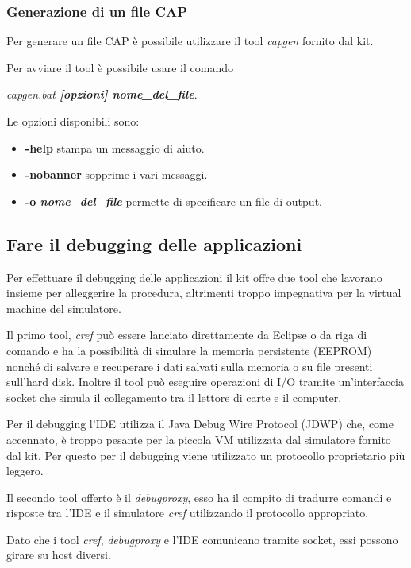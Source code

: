 \subsubsection{Generazione di un file CAP}
Per generare un file CAP è possibile utilizzare il tool \textit{capgen} fornito dal kit.

Per avviare il tool è possibile usare il comando
\begin{center}
    \textit{capgen.bat \textbf{[opzioni] nome\_del\_file}}.
\end{center}

Le opzioni disponibili sono:
\begin{itemize}
    \item \textbf{-help} stampa un messaggio di aiuto.
    \item \textbf{-nobanner} sopprime i vari messaggi.
    \item \textbf{-o \textit{nome\_del\_file}} permette di specificare un file di output.
\end{itemize}
 
\subsection{Fare il debugging delle applicazioni}
Per effettuare il debugging delle applicazioni il kit offre due tool che lavorano insieme per alleggerire la procedura, altrimenti troppo impegnativa per la virtual machine del simulatore.

Il primo tool, \textit{cref} può essere lanciato direttamente da Eclipse o da riga di comando e ha la possibilità di simulare la memoria persistente (EEPROM) nonché di salvare e recuperare i dati salvati sulla memoria o su file presenti sull'hard disk. Inoltre il tool può eseguire operazioni di I/O tramite un'interfaccia socket che simula il collegamento tra il lettore di carte e il computer.

Per il debugging l'IDE utilizza il Java Debug Wire Protocol (JDWP) che, come accennato, è troppo pesante per la piccola VM utilizzata dal simulatore fornito dal kit. Per questo per il debugging viene utilizzato un protocollo proprietario più leggero.

Il secondo tool offerto è il \textit{debugproxy}, esso ha il compito di tradurre comandi e risposte tra l'IDE e il simulatore \textit{cref} utilizzando il protocollo appropriato.

Dato che i tool \textit{cref}, \textit{debugproxy} e l'IDE comunicano tramite socket, essi possono girare su host diversi.


